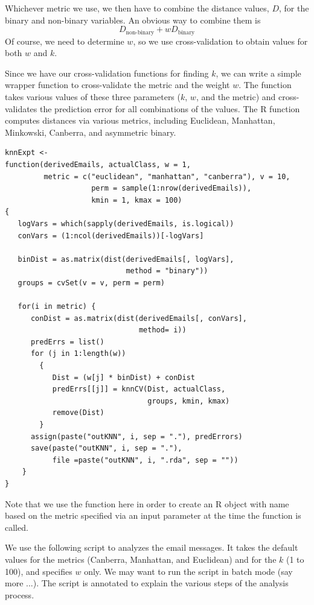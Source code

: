 Whichever metric we use, we then have to combine the distance 
values, $D$, for the binary and non-binary variables. 
An obvious way to combine them is
\[ D_{\textrm{non-binary}} + w D_{\textrm{binary}}\]
Of course, we need to determine $w$, so we use cross-validation
to obtain values for both $w$ and $k$.

Since we have our cross-validation functions for finding $k$, 
we can write a simple wrapper function to cross-validate the metric
and the weight $w$.
The function  takes various values of these
three parameters ($k$, $w$, and the metric) and cross-validates the
prediction error for all combinations of the values.  
The R function
 computes distances via various metrics,
including Euclidean, Manhattan, Minkowski, Canberra, 
and asymmetric binary.

\begin{verbatim}
knnExpt <-
function(derivedEmails, actualClass, w = 1, 
         metric = c("euclidean", "manhattan", "canberra"), v = 10, 
                    perm = sample(1:nrow(derivedEmails)),
                    kmin = 1, kmax = 100)
{
   logVars = which(sapply(derivedEmails, is.logical))
   conVars = (1:ncol(derivedEmails))[-logVars]

   binDist = as.matrix(dist(derivedEmails[, logVars], 
                            method = "binary"))
   groups = cvSet(v = v, perm = perm) 

   for(i in metric) {
      conDist = as.matrix(dist(derivedEmails[, conVars],
                               method= i))
      predErrs = list()
      for (j in 1:length(w)) 
        {
           Dist = (w[j] * binDist) + conDist
           predErrs[[j]] = knnCV(Dist, actualClass,   
                                 groups, kmin, kmax)
           remove(Dist)
        }
      assign(paste("outKNN", i, sep = "."), predErrors)
      save(paste("outKNN", i, sep = "."), 
           file =paste("outKNN", i, ".rda", sep = ""))
    }
}
\end{verbatim}
Note that we use the  function here 
in order to create an R object with name based on the metric
specified via an input parameter at the time the function is called. 

We use the following script to analyzes the email messages.
It takes the default values for the metrics (Canberra, Manhattan,
and Euclidean) and for the $k$ (1 to 100), and specifies $w$ only.
We may want to run the script in batch mode (say more ...).
The script is annotated to explain the various steps of the 
analysis process.

